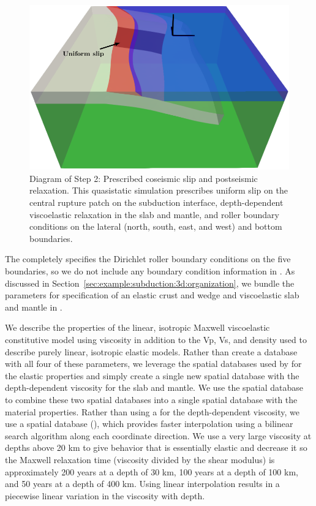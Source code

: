 \begin{figure}[htbp]
  \includegraphics[scale=0.75]{examples/figs/subduction3d_step02_diagram}
  \caption{Diagram of Step 2: Prescribed coseismic slip and
    postseismic relaxation. This quasistatic simulation prescribes
    uniform slip on the central rupture patch on the subduction interface,
    depth-dependent viscoelastic relaxation in the slab and mantle,
    and roller boundary conditions on the lateral (north, south, east,
    and west) and bottom boundaries.}
  \label{fig:example:subduction:3d:step02:diagram}
\end{figure}

The  completely specifies the Dirichlet roller
boundary conditions on the five boundaries, so we do not include any
boundary condition information in . As discussed
in Section~\vref{sec:example:subduction:3d:organization}, we bundle
the parameters for specification of an elastic crust and wedge and
viscoelastic slab and mantle in .

We describe the properties of the linear, isotropic Maxwell
viscoelastic constitutive model using viscosity in addition to the Vp,
Vs, and density used to describe purely linear, isotropic elastic
models. Rather than create a database with all four of these
parameters, we leverage the  spatial databases used
by  for the elastic properties and simply
create a single new spatial database with the depth-dependent
viscosity for the slab and mantle. We use the 
spatial database to combine these two spatial databases into a single
spatial database with the material properties. Rather than using a
 for the depth-dependent viscosity, we use a
 spatial database
(), which provides faster
interpolation using a bilinear search algorithm along each coordinate
direction. We use a very large viscosity at depths above 20 km to give
behavior that is essentially elastic and decrease it so the Maxwell
relaxation time (viscosity divided by the shear modulus) is
approximately 200 years at a depth of 30 km, 100 years at a depth of
100 km, and 50 years at a depth of 400 km. Using linear interpolation
results in a piecewise linear variation in the viscosity with depth.

